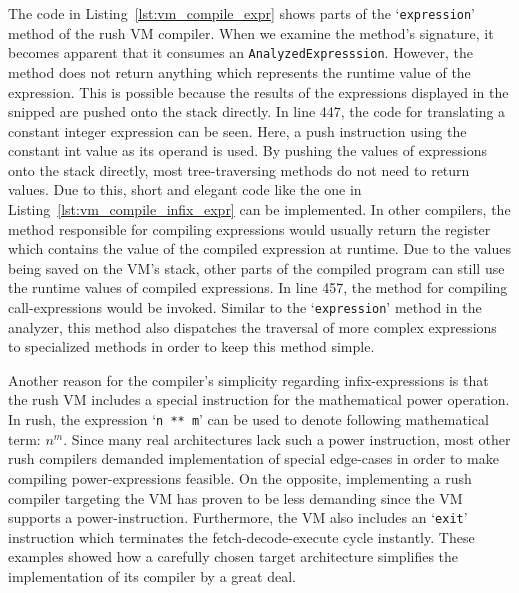 The code in Listing~\ref{lst:vm_compile_expr} shows parts of the `\texttt{expression}' method of the rush VM compiler.
When we examine the method's signature, it becomes apparent that it consumes an \texttt{AnalyzedExpresssion}.
However, the method does not return anything which represents the runtime value of the expression.
This is possible because the results of the expressions displayed in the snipped are pushed onto the stack directly.
In line 447, the code for translating a constant integer expression can be seen.
Here, a push instruction using the constant int value as its operand is used.
By pushing the values of expressions onto the stack directly, most tree-traversing methods do not need to return values.
Due to this, short and elegant code like the one in Listing~\ref{lst:vm_compile_infix_expr} can be implemented.
In other compilers, the method responsible for compiling expressions would usually return the register which contains the value of the compiled expression at runtime.
Due to the values being saved on the VM's stack, other parts of the compiled program can still use the runtime values of compiled expressions.
In line 457, the method for compiling call-expressions would be invoked.
Similar to the `\texttt{expression}' method in the analyzer, this method also dispatches the traversal of more complex expressions to specialized methods in order to keep this method simple.

Another reason for the compiler's simplicity regarding infix-expressions is that the rush VM includes a special instruction for the mathematical power operation.
In rush, the expression `\texttt{n ** m}' can be used to denote following mathematical term: $n^m$.
Since many real architectures lack such a power instruction, most other rush compilers demanded implementation of special edge-cases in order to make compiling power-expressions feasible.
On the opposite, implementing a rush compiler targeting the VM has proven to be less demanding since the VM supports a power-instruction.
Furthermore, the VM also includes an `\texttt{exit}' instruction which terminates the fetch-decode-execute cycle instantly.
These examples showed how a carefully chosen target architecture simplifies the implementation of its compiler by a great deal.

